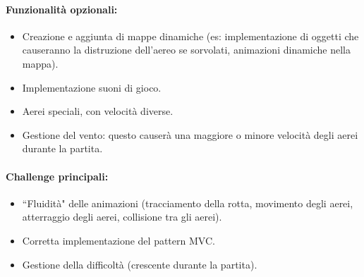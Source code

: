 \documentclass[a4paper,12pt]{report}
\begin{document}
\paragraph{Funzionalità opzionali:}
\begin{itemize}
    \item Creazione e aggiunta di mappe dinamiche (es: implementazione di oggetti che causeranno la distruzione dell’aereo se sorvolati, animazioni dinamiche nella mappa).
    
    \item Implementazione suoni di gioco.
    
    \item Aerei speciali, con velocità diverse.
    
    \item Gestione del vento: questo causerà una maggiore o minore velocità degli aerei durante la partita.
\end{itemize}

\paragraph{\textbf{Challenge principali:}}
\begin{itemize}
    \item “Fluidità" delle animazioni (tracciamento della rotta, movimento degli aerei, atterraggio degli aerei, collisione tra gli aerei).
    
    \item Corretta implementazione del pattern MVC.
    \item Gestione della difficoltà (crescente durante la partita).
\end{itemize}
\end{document}
